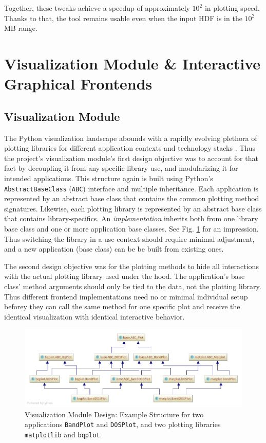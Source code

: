 Together, these tweaks achieve a speedup of approximately \(10^2\) in plotting
speed. Thanks to that, the tool remains usable even when the input HDF is in the
\(10^2\) MB range.

\section{Visualization Module \& Interactive Graphical Frontends}
\label{sec:visualization-module}

\subsection{Visualization Module}
\label{sec:visualization-interface}

The Python visualization landscape abounds with a rapidly evolving plethora of
plotting libraries for different application contexts and technology stacks
\cite{python-viz-landscape}. Thus the project's visualization module's first
design objective was to account for that fact by decoupling it from any specific library
use, and modularizing it for intended applications. This structure again is built using Python's
\texttt{AbstractBaseClass} (\texttt{ABC}) interface and multiple inheritance.
Each application is represented by an abstract base class that contains the
common plotting method signatures. Likewise, each plotting library is represented by an
abstract base class that contains library-specifics. An \emph{implementation} inherits
both from one library base class and one or more application base classes. See
Fig. \ref{fig:visualization-module} for an impression. Thus switching the
library in a use context should require minimal adjustment, and a new
application (base class) can be be built from existing ones.

The second design objective was for the plotting methods to hide all
interactions with the actual plotting library used under the hood. The
application's base class' method arguments should only be tied to the data, not
the plotting library. Thus different frontend implementations need no or minimal
individual setup beforey they can call the same method for one specific plot
and receive the identical visualization with identical interactive behavior.

\begin{figure}[htb!]
    \centering
    \includegraphics[width=1.0\linewidth]{img/pycharm_uml/matplot.png}
    \caption[Visualization Module Design]{Visualization Module Design: Example
      Structure for two applications \texttt{BandPlot} and \texttt{DOSPlot}, and
      two plotting libraries \texttt{matplotlib} and \texttt{bqplot}.}
    \label{fig:visualization-module}
\end{figure}

